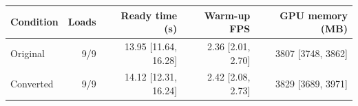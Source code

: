 \begin{tabular}{lrrrr}
\toprule
Condition & Loads & Ready time (s) & Warm-up FPS & GPU memory (MB) \\
\midrule
Original & 9/9 & 13.95 [11.64, 16.28] & 2.36 [2.01, 2.70] & 3807 [3748, 3862] \\
Converted & 9/9 & 14.12 [12.31, 16.24] & 2.42 [2.08, 2.73] & 3829 [3689, 3971] \\
\bottomrule
\end{tabular}
